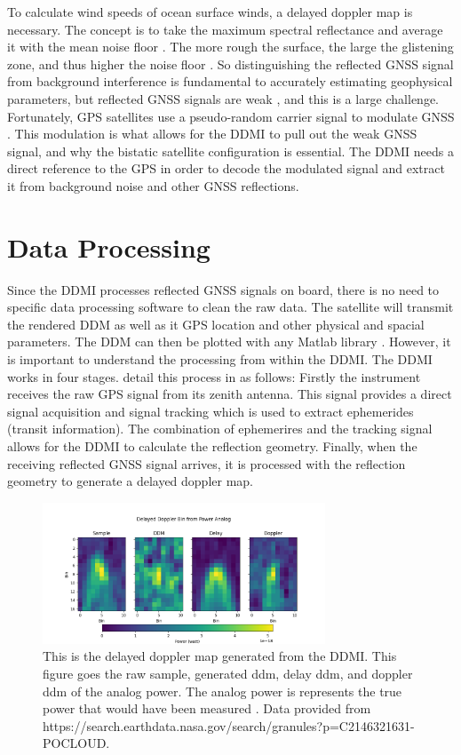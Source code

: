 \documentclass[12pt]{article}
\begin{document}
To calculate wind speeds of ocean surface winds, a delayed doppler map is necessary. The concept is to take the maximum spectral reflectance and average it with the mean noise floor \cite{GNSS_Signal_Properties}. The more rough the surface, the large the glistening zone, and thus higher the noise floor \cite{DDMI_Overview}. So distinguishing the reflected GNSS signal from background interference is fundamental to accurately estimating geophysical parameters, but reflected GNSS signals are weak \cite{SGR-ReSi_Application}, and this is a large challenge. Fortunately, GPS satellites use a pseudo-random carrier signal to modulate GNSS \cite{GNSS_Signal_Properties}. This modulation is what allows for the DDMI to pull out the weak GNSS signal, and why the bistatic satellite configuration is essential. The DDMI needs a direct reference to the GPS in order to decode the modulated signal and extract it from background noise and other GNSS reflections.

\section{Data Processing}

Since the DDMI processes reflected GNSS signals on board, there is no need to specific data processing software to clean the raw data. The satellite will transmit the rendered DDM as well as it GPS location and other physical and spacial parameters. The DDM can then be plotted with any Matlab library \cite{SGR-ReSi_Application}. However, it is important to understand the processing from within the DDMI. The DDMI works in four stages. \citeauthor{SGR-ReSi_Application} detail this process in as follows: Firstly the instrument receives the raw GPS signal from its zenith antenna. This signal provides a direct signal acquisition and signal tracking which is used to extract ephemerides (transit information). The combination of ephemerires and the tracking signal allows for the DDMI to calculate the reflection geometry. Finally, when the receiving reflected GNSS signal arrives, it is processed with the reflection geometry to generate a delayed doppler map. 

\begin{figure}[H]
    \centering
    \includegraphics[width=0.75\textwidth]{Resource_PDFs/DDM.png}
    \caption{This is the delayed doppler map generated from the DDMI. This figure goes the raw sample, generated ddm, delay ddm, and doppler ddm of the analog power. The analog power is represents the true power that would have been measured \cite{Data}. Data provided from https://search.earthdata.nasa.gov/search/granules?p=C2146321631-POCLOUD.}
    \label{fig:Delayed Doppler Map}
\end{figure}
\end{document}
